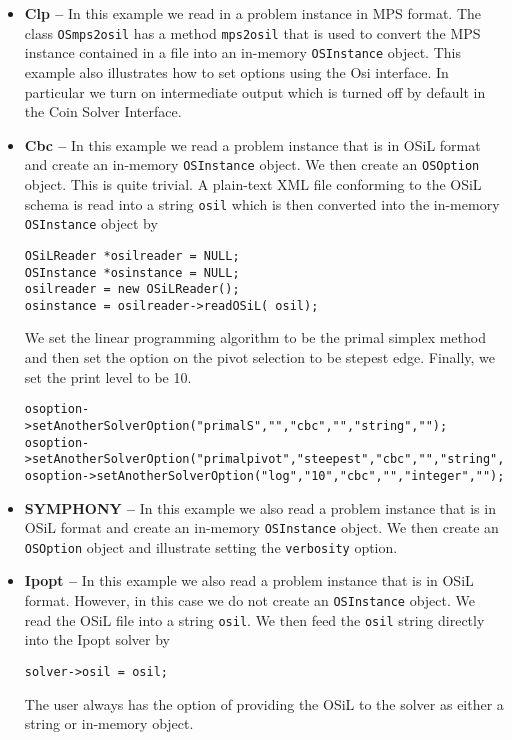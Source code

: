 \documentclass[11pt]{article}
\renewcommand{\_}{{\char"5F}}
\renewcommand{\{}{{\char"7B}}
\renewcommand{\}}{{\char"7D}}
\renewcommand{\^}{{\char"0D}}
\renewcommand{\'}{{\char"0D}}
\begin{document}
\begin{itemize}
\item {\bf Clp --}  In this example we read in a problem instance in MPS format.  The class 
{\tt OSmps2osil}  has a method {\tt mps2osil} that is used to convert the MPS instance contained 
in a file into an in-memory {\tt OSInstance} object. This example also illustrates how to 
set options using the Osi interface. In particular we turn on intermediate output which is 
turned off by default in the Coin Solver Interface. 

\item {\bf Cbc --}  In this example we read a problem instance that is in OSiL format and create 
an in-memory {\tt OSInstance} object.  We then create an {\tt OSOption} object.  This is quite trivial.  
A  plain-text XML file conforming to the OSiL schema is read into a string {\tt osil} which is then 
converted into the in-memory {\tt OSInstance} object by

\begin{verbatim}
OSiLReader *osilreader = NULL;
OSInstance *osinstance = NULL;
osilreader = new OSiLReader(); 
osinstance = osilreader->readOSiL( osil);
\end{verbatim}


 We set the linear programming algorithm to be the primal simplex method and then set the option 
on the pivot selection to be stepest edge.  Finally, we set the print level to be 10.

\begin{verbatim}
osoption->setAnotherSolverOption("primalS","","cbc","","string","");
osoption->setAnotherSolverOption("primalpivot","steepest","cbc","","string","");
osoption->setAnotherSolverOption("log","10","cbc","","integer","");
\end{verbatim}


\item {\bf SYMPHONY --}   In this example we also read a problem instance that is in OSiL format and 
create an in-memory {\tt OSInstance} object.  We then create an {\tt OSOption} object and 
illustrate setting the {\tt verbosity} option.

\item {\bf Ipopt --}   In this example we also read a problem instance that is in OSiL format.  
However, in this case we do  not create an {\tt OSInstance} object. We read the OSiL file into 
a string {\tt osil}.  We then feed the {\tt osil} string directly into the Ipopt solver by
\begin{verbatim}
solver->osil = osil;
\end{verbatim} 
The user always has the option of providing the OSiL to the solver as either a string or in-memory object.


\end{itemize}
\end{document}
